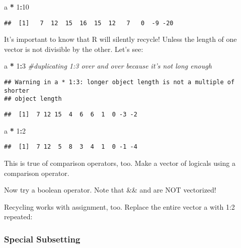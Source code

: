 \documentclass[]{article}
\newenvironment{Shaded}{\begin{snugshade}}{\end{snugshade}}
\newcommand{\DecValTok}[1]{\textcolor[rgb]{0.00,0.00,0.81}{#1}}
\newcommand{\StringTok}[1]{\textcolor[rgb]{0.31,0.60,0.02}{#1}}
\newcommand{\CommentTok}[1]{\textcolor[rgb]{0.56,0.35,0.01}{\textit{#1}}}
\newcommand{\OperatorTok}[1]{\textcolor[rgb]{0.81,0.36,0.00}{\textbf{#1}}}
\newcommand{\NormalTok}[1]{#1}
\begin{document}
\begin{Shaded}
\begin{Highlighting}[]
\NormalTok{a }\OperatorTok{*}\StringTok{ }\DecValTok{1}\OperatorTok{:}\DecValTok{10}
\end{Highlighting}
\end{Shaded}

\begin{verbatim}
##  [1]   7  12  15  16  15  12   7   0  -9 -20
\end{verbatim}

It's important to know that R will silently recycle! Unless the length
of one vector is not divisible by the other. Let's see:

\begin{Shaded}
\begin{Highlighting}[]
\NormalTok{a }\OperatorTok{*}\StringTok{ }\DecValTok{1}\OperatorTok{:}\DecValTok{3} \CommentTok{#duplicating 1:3 over and over because it's not long enough}
\end{Highlighting}
\end{Shaded}

\begin{verbatim}
## Warning in a * 1:3: longer object length is not a multiple of shorter
## object length
\end{verbatim}

\begin{verbatim}
##  [1]  7 12 15  4  6  6  1  0 -3 -2
\end{verbatim}

\begin{Shaded}
\begin{Highlighting}[]
\NormalTok{a }\OperatorTok{*}\StringTok{ }\DecValTok{1}\OperatorTok{:}\DecValTok{2}
\end{Highlighting}
\end{Shaded}

\begin{verbatim}
##  [1]  7 12  5  8  3  4  1  0 -1 -4
\end{verbatim}

This is true of comparison operators, too. Make a vector of logicals
using a comparison operator.

Now try a boolean operator. Note that \&\& and \textbar{}\textbar{} are
NOT vectorized!

Recycling works with assignment, too. Replace the entire vector a with
1:2 repeated:

\subsubsection{Special Subsetting}\label{special-subsetting}
\end{document}
